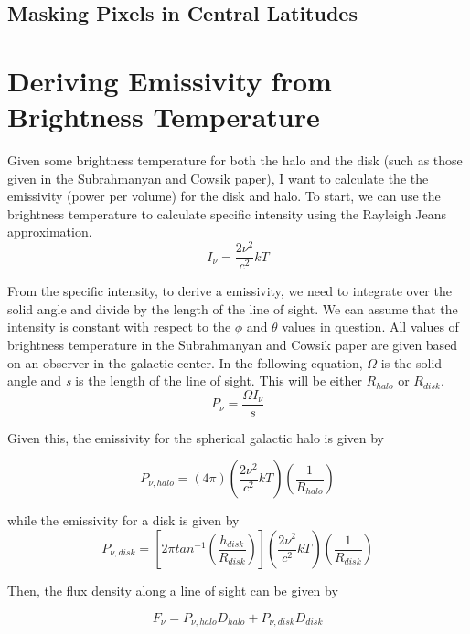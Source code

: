 \documentclass[letterpaper, 10pt]{article}
\begin{document}
\subsection{Masking Pixels in Central Latitudes}

\section{Deriving Emissivity from Brightness Temperature}
Given some brightness temperature for both the halo and the disk (such as those given in the Subrahmanyan and Cowsik paper), I want to calculate the the emissivity (power per volume) for the disk and halo. To start, we can use the brightness temperature to calculate specific intensity using the Rayleigh Jeans approximation. 
\[ I_{\nu} = \frac{2\nu^{2}}{c^{2}}kT \]

From the specific intensity, to derive a emissivity, we need to integrate over the solid angle and divide by the length of the line of sight. We can assume that the intensity is constant with respect to the $\phi$ and $\theta$ values in question. All values of brightness temperature in the Subrahmanyan and Cowsik paper are given based on an observer in the galactic center. In the following equation, $\Omega$ is the solid angle and \emph{s} is the length of the line of sight. This will be either $R_{halo}$ or $R_{disk}$.
\[ P_{\nu} = \frac{\Omega I_{\nu}}{s} \]

Given this, the emissivity for the spherical galactic halo is given by 

\[P_{\nu, halo} = (4\pi)\left(\frac{2\nu^{2}}{c^{2}}kT\right)\left(\frac{1}{R_{halo}}\right)\]

while the emissivity for a disk is given by 
\[P_{\nu, disk} = \left[ 2\pi tan^{-1}\left(\frac{h_{disk}}{R_{disk}}\right) \right]\left(\frac{2\nu^{2}}{c^{2}}kT\right)\left(\frac{1}{R_{disk}}\right)\]

Then, the flux density along a line of sight can be given by 

\[F_{\nu} = P_{\nu, halo}D_{halo} + P_{\nu, disk}D_{disk} \]
\end{document}
